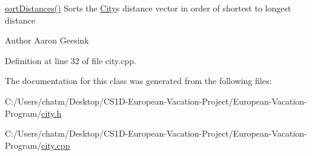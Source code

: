 \mbox{\hyperlink{class_city_a9e3da459f9dcf61ae1a4551d79abafb8}{sort\+Distances()}} Sorts the \mbox{\hyperlink{class_city}{City}}\textquotesingle{}s distance vector in order of shortest to longest distance 

\begin{DoxyAuthor}{Author}
Aaron Geesink 
\end{DoxyAuthor}


Definition at line 32 of file city.\+cpp.



The documentation for this class was generated from the following files\+:\begin{DoxyCompactItemize}
\item 
C\+:/\+Users/chatm/\+Desktop/\+C\+S1\+D-\/\+European-\/\+Vacation-\/\+Project/\+European-\/\+Vacation-\/\+Program/\mbox{\hyperlink{city_8h}{city.\+h}}\item 
C\+:/\+Users/chatm/\+Desktop/\+C\+S1\+D-\/\+European-\/\+Vacation-\/\+Project/\+European-\/\+Vacation-\/\+Program/\mbox{\hyperlink{city_8cpp}{city.\+cpp}}\end{DoxyCompactItemize}
